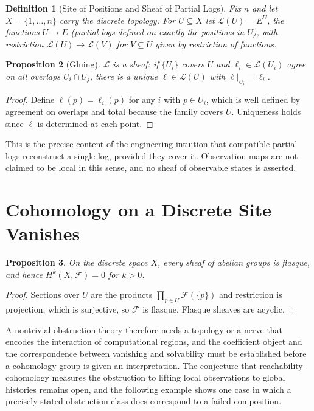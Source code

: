 \documentclass[12pt,oneside,openany]{book}
\theoremstyle{spherepop}
\newtheorem{definition}{Definition}[chapter]
\newtheorem{proposition}[definition]{Proposition}
\theoremstyle{remarkstyle}
\begin{document}
\begin{definition}[Site of Positions and Sheaf of Partial Logs]
Fix $n$ and let $X=\{1,\dots,n\}$ carry the discrete topology. For $U\subseteq X$ let $\mathscr L(U)=E^U$, the functions $U\to E$ (partial logs defined on exactly the positions in $U$), with restriction $\mathscr L(U)\to\mathscr L(V)$ for $V\subseteq U$ given by restriction of functions.
\end{definition}

\begin{proposition}[Gluing]
\label{prop:sheaf}
$\mathscr L$ is a sheaf: if $\{U_i\}$ covers $U$ and $\ell_i\in\mathscr L(U_i)$ agree on all overlaps $U_i\cap U_j$, there is a unique $\ell\in\mathscr L(U)$ with $\ell|_{U_i}=\ell_i$.
\end{proposition}

\begin{proof}
Define $\ell(p)=\ell_i(p)$ for any $i$ with $p\in U_i$, which is well defined by agreement on overlaps and total because the family covers $U$. Uniqueness holds since $\ell$ is determined at each point.
\end{proof}

This is the precise content of the engineering intuition that compatible partial logs reconstruct a single log, provided they cover it. Observation maps are not claimed to be local in this sense, and no sheaf of observable states is asserted.

\section{Cohomology on a Discrete Site Vanishes}

\begin{proposition}
On the discrete space $X$, every sheaf of abelian groups is flasque, and hence $H^k(X,\mathscr F)=0$ for $k>0$.
\end{proposition}

\begin{proof}
Sections over $U$ are the products $\prod_{p\in U}\mathscr F(\{p\})$ and restriction is projection, which is surjective, so $\mathscr F$ is flasque. Flasque sheaves are acyclic.
\end{proof}

A nontrivial obstruction theory therefore needs a topology or a nerve that encodes the interaction of computational regions, and the coefficient object and the correspondence between vanishing and solvability must be established before a cohomology group is given an interpretation. The conjecture that reachability cohomology measures the obstruction to lifting local observations to global histories remains open, and the following example shows one case in which a precisely stated obstruction class does correspond to a failed composition.
\end{document}
